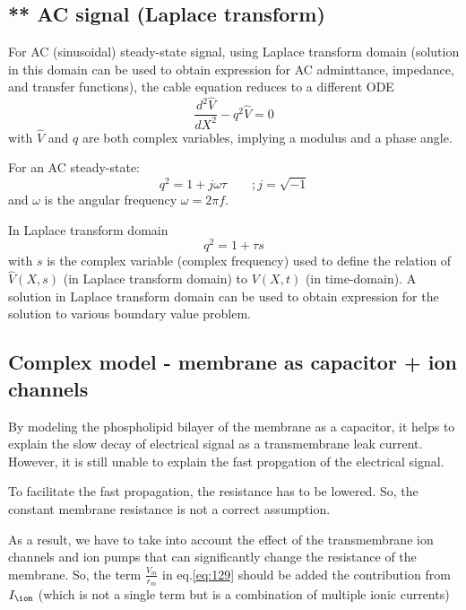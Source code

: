 \subsection{** AC signal (Laplace transform)}
\label{sec:Laplace-transform}

For AC (sinusoidal) steady-state signal, using Laplace transform domain
(solution in this domain can be used to obtain expression for AC adminttance,
impedance, and transfer functions), the cable equation reduces to a different
ODE
\begin{equation}
\frac{d^2 \hat{V}}{dX^2} - q^2 \hat{V} = 0
\end{equation}
with $\hat{V}$ and $q$ are both complex variables, implying a modulus and a
phase angle.

For an AC steady-state:
\begin{equation}
q^2 = 1 + j \omega \tau \qquad; j = \sqrt{-1}
\end{equation}
and $\omega$ is the angular frequency $\omega = 2\pi f$.

In Laplace transform domain
\begin{equation}
q^2 = 1 + \tau s
\end{equation}
with $s$ is the complex variable (complex frequency) used to define the
relation of $\hat{V}(X,s)$ (in Laplace transform domain) to $V(X,t)$ (in
time-domain). A solution in Laplace transform domain can be used to obtain
expression for the solution to various boundary value problem.

\subsection{Complex model - membrane as capacitor + ion channels}
\label{sec:complex-model-action}

By modeling the phospholipid bilayer of the membrane as a capacitor, it helps to
explain the slow decay of electrical signal as a transmembrane leak current.
However, it is still unable to explain the fast propgation of the electrical
signal.

To facilitate the fast propagation, the resistance has to be lowered.
So, the constant membrane resistance is not a correct assumption.

As a result, we have to take into account the effect of the transmembrane ion
channels and ion pumps that can significantly change the
resistance of the membrane. So, the term $\frac{V_m}{r_m}$ in eq.\ref{eq:129}
should be added the contribution from $I_\ion$ (which is not a single term but
is a combination of multiple ionic currents)

